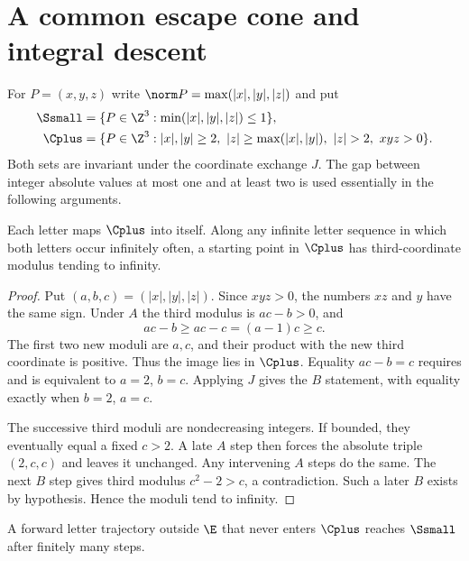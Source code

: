 \section{A common escape cone and integral descent}\label{sec:escape}

For $P=(x,y,z)$ write $\norm P=\max(|x|,|y|,|z|)$ and put
\begin{equation}\label{eq:domains}
 \begin{aligned}
 \Ssmall&=\{P\in\Z^3:\min(|x|,|y|,|z|)\le1\},\\
 \Cplus&=\{P\in\Z^3:|x|,|y|\ge2,\
 |z|\ge\max(|x|,|y|),\ |z|>2,\ xyz>0\}.
 \end{aligned}
\end{equation}
Both sets are invariant under the coordinate exchange $J$.
The gap between integer absolute values at most one and at least
two is used essentially in the following arguments.

\begin{lemma}\label{lem:cone}
Each letter maps $\Cplus$ into itself. Along any infinite
letter sequence in which both letters occur infinitely often,
a starting point in $\Cplus$ has third-coordinate modulus
tending to infinity.
\end{lemma}

\begin{proof}
Put $(a,b,c)=(|x|,|y|,|z|)$. Since $xyz>0$, the numbers $xz$
and $y$ have the same sign. Under $A$ the third modulus is
$ac-b>0$, and
\[
 ac-b\ge ac-c=(a-1)c\ge c.
\]
The first two new moduli are $a,c$, and their product with the
new third coordinate is positive. Thus the image lies in
$\Cplus$. Equality $ac-b=c$ requires and is equivalent to
$a=2$, $b=c$. Applying $J$ gives the $B$ statement, with
equality exactly when $b=2$, $a=c$.

The successive third moduli are nondecreasing integers. If
bounded, they eventually equal a fixed $c>2$. A late $A$ step
then forces the absolute triple $(2,c,c)$ and leaves it
unchanged. Any intervening $A$ steps do the same. The next
$B$ step gives third modulus $c^2-2>c$, a contradiction.
Such a later $B$ exists by hypothesis. Hence the moduli
tend to infinity.
\end{proof}

\begin{lemma}\label{lem:descent}
A forward letter trajectory outside $\E$ that never enters
$\Cplus$ reaches $\Ssmall$ after finitely many steps.
\end{lemma}

